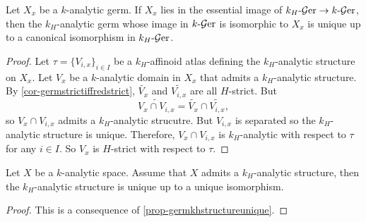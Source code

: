 \begin{proposition}\label{prop-germkhstructureunique}
    Let $X_x$ be a $k$-analytic germ. If $X_x$ lies in the essential image of $k_H\text{-}\mathcal{G}\mathrm{er}\rightarrow k\text{-}\mathcal{G}\mathrm{er}$, then the $k_H$-analytic germ whose image in $k\text{-}\mathcal{G}\mathrm{er}$ is isomorphic to $X_x$ is unique up to a canonical isomorphism in $k_H\text{-}\mathcal{G}\mathrm{er}$.
\end{proposition}
\begin{proof}
    Let $\tau=\{V_{i,x}\}_{i\in I}$ be a $k_H$-affinoid atlas defining the $k_H$-analytic structure on $X_x$. Let $V_x$ be a $k$-analytic domain in $X_x$ that admits a $k_H$-analytic structure. By  \cref{cor-germstrictiffredstrict}, $\widetilde{V_x}$ and $\widetilde{V_{i,x}}$ are all $H$-strict. But 
    \[
        \widetilde{V_x\cap V_{i,x}}=  \widetilde{V_x}\cap \widetilde{V_{i,x}},
    \] 
    so $V_x\cap V_{i,x}$ admits a $k_H$-analytic strucutre. But  $V_{i,x}$ is separated so the $k_H$-analytic structure is unique. Therefore, $V_x\cap V_{i,x}$ is $k_H$-analytic with respect to $\tau$ for any $i\in I$. So $V_x$ is $H$-strict with respect to $\tau$. 
\end{proof}

\begin{corollary}
    Let $X$ be a $k$-analytic space. Assume that $X$ admits a $k_H$-analytic structure, then the $k_H$-analytic structure is unique up to a unique isomorphism.
\end{corollary}
\begin{proof}
    This is a consequence of \cref{prop-germkhstructureunique}.
\end{proof}

